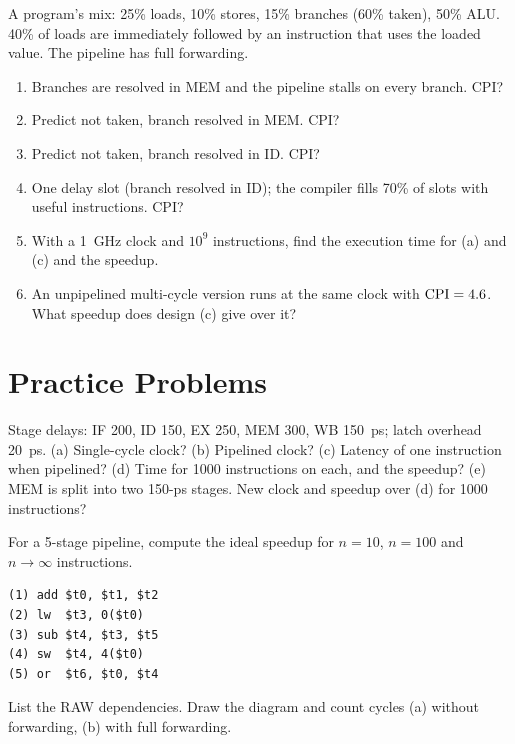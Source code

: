 \documentclass[11pt]{article}
\begin{document}
\begin{exercise}\label{x:branches}
A program's mix: 25\% loads, 10\% stores, 15\% branches (60\% taken), 50\%
ALU. 40\% of loads are immediately followed by an instruction that uses the
loaded value. The pipeline has full forwarding.
\begin{enumerate}[label=(\alph*),leftmargin=*]
  \item Branches are resolved in MEM and the pipeline stalls on every branch.
  CPI?
  \item Predict not taken, branch resolved in MEM. CPI?
  \item Predict not taken, branch resolved in ID. CPI?
  \item One delay slot (branch resolved in ID); the compiler fills 70\% of
  slots with useful instructions. CPI?
  \item With a 1~GHz clock and $10^9$ instructions, find the execution time
  for (a) and (c) and the speedup.
  \item An unpipelined multi-cycle version runs at the same clock with
  $\mathrm{CPI} = 4.6$. What speedup does design (c) give over it?
\end{enumerate}
\end{exercise}

\section{Practice Problems}

\begin{exercise}\label{p:clock}
Stage delays: IF 200, ID 150, EX 250, MEM 300, WB 150~ps; latch overhead
20~ps. (a) Single-cycle clock? (b) Pipelined clock? (c) Latency of one
instruction when pipelined? (d) Time for 1000 instructions on each, and the
speedup? (e) MEM is split into two 150-ps stages. New clock and speedup over
(d) for 1000 instructions?
\end{exercise}

\begin{exercise}\label{p:ideal}
For a 5-stage pipeline, compute the ideal speedup for $n=10$, $n=100$ and
$n\to\infty$ instructions.
\end{exercise}

\begin{exercise}\label{p:stalls}
\leavevmode
\begin{lstlisting}
(1) add $t0, $t1, $t2
(2) lw  $t3, 0($t0)
(3) sub $t4, $t3, $t5
(4) sw  $t4, 4($t0)
(5) or  $t6, $t0, $t4
\end{lstlisting}
List the RAW dependencies. Draw the diagram and count cycles (a) without
forwarding, (b) with full forwarding.
\end{exercise}
\end{document}
